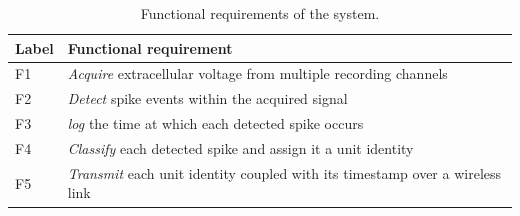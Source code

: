 \documentclass[11pt]{article}
\begin{document}
\begin{table}[H]
\centering
\caption{Functional requirements of the system.}
\label{tab:funcreq}
{\footnotesize
\setlength{\tabcolsep}{4pt}
\renewcommand{\arraystretch}{1.25}
\begin{tabularx}{\textwidth}{@{}l L@{}}
\toprule
Label & Functional requirement \\
\midrule
F1 & \emph{Acquire} extracellular voltage from multiple recording channels \\
F2 & \emph{Detect} spike events within the acquired signal \\
F3 & \emph{log} the time at which each detected spike occurs \\
F4 & \emph{Classify} each detected spike and assign it a unit identity \\
F5 & \emph{Transmit} each unit identity coupled with its timestamp over a wireless link \\
\bottomrule
\end{tabularx}
}
\end{table}

\end{document}
